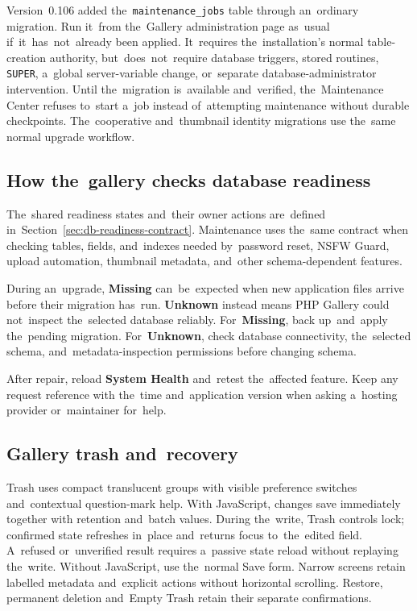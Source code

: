 \documentclass[11pt,a4paper]{article}
\newcommand{\ui}[1]{\textbf{#1}}
\newcommand{\codeword}[1]{\nolinkurl{#1}}
\begin{document}
Version~0.106 added the~\codeword{maintenance\_jobs} table through an~ordinary
migration. Run it~from the~Gallery administration page as~usual
if~it~has~not~already been applied. It~requires the~installation's normal
table-creation authority, but~does~not~require database triggers, stored
routines, \codeword{SUPER}, a~global server-variable change, or~separate
database-administrator intervention. Until the~migration is~available
and~verified, the~Maintenance Center refuses to~start a~job instead
of~attempting maintenance without durable checkpoints. The~cooperative
and~thumbnail identity migrations use the~same normal upgrade workflow.

\subsection{How the~gallery checks database readiness}

The~shared readiness states and~their owner actions are~defined
in~Section~\ref{sec:db-readiness-contract}. Maintenance uses the~same contract
when checking tables, fields, and~indexes needed by~password reset, NSFW Guard,
upload automation, thumbnail metadata, and~other schema-dependent features.

During an~upgrade, \ui{Missing} can~be~expected when new application files
arrive before their migration has~run. \ui{Unknown} instead means PHP Gallery
could not~inspect the~selected database reliably. For~\ui{Missing}, back
up~and~apply the~pending migration. For~\ui{Unknown}, check database
connectivity, the~selected schema, and~metadata-inspection permissions before
changing schema.

After repair, reload \ui{System Health} and~retest the~affected feature. Keep
any request reference with the~time and~application version when asking
a~hosting provider or~maintainer for~help.

\subsection{Gallery trash and~recovery}

Trash uses compact translucent groups with visible preference switches
and~contextual question-mark help. With JavaScript, changes save immediately
together with retention and~batch values. During the~write, Trash controls lock;
confirmed state refreshes in~place and~returns focus to~the~edited field.
A~refused or~unverified result requires a~passive state reload without replaying
the~write. Without JavaScript, use the~normal Save form. Narrow screens retain
labelled metadata and~explicit actions without horizontal scrolling. Restore,
permanent deletion and~Empty Trash retain their separate confirmations.
\end{document}
